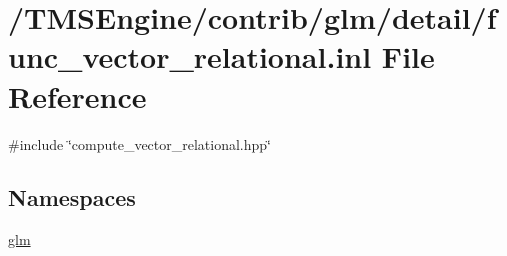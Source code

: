 \hypertarget{func__vector__relational_8inl}{}\section{/\+T\+M\+S\+Engine/contrib/glm/detail/func\+\_\+vector\+\_\+relational.inl File Reference}
\label{func__vector__relational_8inl}
{\ttfamily \#include \char`\"{}compute\+\_\+vector\+\_\+relational.\+hpp\char`\"{}}\newline
\subsection*{Namespaces}
\begin{DoxyCompactItemize}
\item 
 \hyperlink{namespaceglm}{glm}
\end{DoxyCompactItemize}

